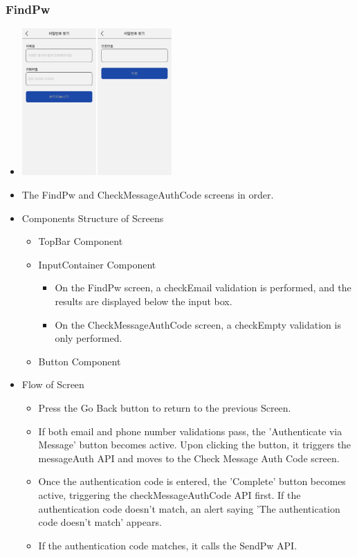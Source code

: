 \documentclass[conference]{IEEEtran}
\begin{document}
\subsubsection{FindPw}
\begin{itemize}
    \item[] \includegraphics[width=0.45\textwidth]{img/Screen/5_FindPw.png}
    \item The FindPw and CheckMessageAuthCode screens in order.
    \item Components Structure of Screens
    \begin{itemize}
        \item TopBar Component
        \item InputContainer Component
        \begin{itemize}
            \item On the FindPw screen, a checkEmail validation is performed, and the results are displayed below the input box.
            \item On the CheckMessageAuthCode screen, a checkEmpty validation is only performed.
        \end{itemize}
        \item Button Component
    \end{itemize}
    \item Flow of Screen
    \begin{itemize}
        \item Press the Go Back button to return to the previous Screen.
        \item If both email and phone number validations pass, the 'Authenticate via Message' button becomes active. Upon clicking the button, it triggers the messageAuth API and moves to the Check Message Auth Code screen.
        \item Once the authentication code is entered, the 'Complete' button becomes active, triggering the checkMessageAuthCode API first. If the authentication code doesn't match, an alert saying 'The authentication code doesn't match' appears.
        \item If the authentication code matches, it calls the SendPw API.
        \\
    \end{itemize}
\end{itemize}
\newpage
\end{document}

